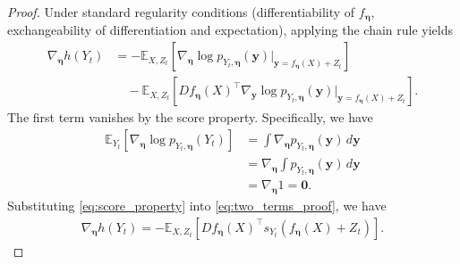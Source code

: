 \documentclass[10pt,a4paper]{amsart}
\newcommand{\E}{\mathbb{E}}
\newcommand{\Yt}{Y_t}
\newcommand{\sYt}{s_{\Yt}}
\begin{document}
\begin{proof}
Under standard regularity conditions (differentiability of $f_{\bm \eta}$, 
exchangeability of differentiation and expectation), applying the chain rule yields
\begin{align}
\nabla_{\bm \eta} h(\Yt)
&= -\E_{X,Z_t}\left[\nabla_{\bm \eta} \log p_{\Yt,\bm \eta}(\bm y)\big|_{\bm y=f_{\bm \eta}(X)+Z_t}\right] \nonumber \\
&\quad - \E_{X,Z_t}\left[D f_{\bm \eta}(X)^\top \nabla_{\bm y} \log p_{\Yt,\bm \eta}(\bm y)\big|_{\bm y=f_{\bm \eta}(X)+Z_t}\right].
\label{eq:two_terms_proof}
\end{align}
The first term vanishes by the score property. Specifically, we have 
\begin{align}
\E_{Y_t}\left[\nabla_{\bm \eta} \log p_{\Yt,\bm \eta}(\Yt)\right]
&= \int \nabla_{\bm \eta} p_{\Yt,\bm \eta}(\bm y)\,d\bm y \\
&= \nabla_{\bm \eta} \int p_{\Yt,\bm \eta}(\bm y)\,d\bm y  \\
&= \nabla_{\bm \eta} 1 = \bm{0}.
\label{eq:score_property}
\end{align}
Substituting \eqref{eq:score_property} into \eqref{eq:two_terms_proof},
we have
\begin{align}
\nabla_{\bm \eta} h(\Yt) = -\E_{X,Z_t}\left[D f_{\bm \eta}(X)^\top \sYt(f_{\bm \eta}(X) + Z_t)\right].
\end{align}
\end{proof}
\end{document}
